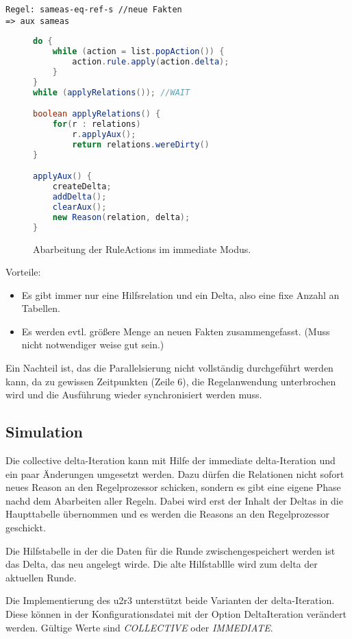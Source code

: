 \begin{verbatim}
Regel: sameas-eq-ref-s //neue Fakten
=> aux sameas
\end{verbatim}

\begin{figure}[htp]
	\caption{Abarbeitung der RuleActions im immediate Modus.}
	\label{code-immediate-delta-iteration}
	\begin{lstlisting}[language=Java]
do {
	while (action = list.popAction()) {
		action.rule.apply(action.delta);
	}
}
while (applyRelations()); //WAIT

boolean applyRelations() {
	for(r : relations)
		r.applyAux();
		return relations.wereDirty()
}

applyAux() {
	createDelta;
	addDelta();
	clearAux();
	new Reason(relation, delta);
}
	\end{lstlisting}
\end{figure}

Vorteile:
\begin{itemize}
  \item Es gibt immer nur eine Hilfsrelation und ein Delta, also eine fixe Anzahl an Tabellen.
  \item Es werden evtl. größere Menge an neuen Fakten zusammengefasst. (Muss nicht notwendiger weise gut sein.)
\end{itemize}

Ein Nachteil ist, das die Parallelsierung nicht vollständig durchgeführt werden kann, da zu gewissen Zeitpunkten (Zeile 6), die Regelanwendung unterbrochen wird und die Ausführung wieder synchronisiert werden muss.

\subsection{Simulation}

Die collective delta-Iteration kann mit Hilfe der immediate delta-Iteration und ein paar Änderungen umgesetzt werden. Dazu dürfen die Relationen nicht sofort neues Reason an den Regelprozessor schicken, sondern es gibt eine eigene Phase nachd dem Abarbeiten aller Regeln. Dabei wird erst der Inhalt der Deltas in die Haupttabelle übernommen und es werden die Reasons an den Regelprozessor geschickt.

Die Hilfstabelle in der die Daten für die Runde zwischengespeichert werden ist das Delta, das neu angelegt wirde. Die alte Hilfstabllle wird zum delta der aktuellen Runde.


Die Implementierung des u2r3 unterstützt beide Varianten der delta-Iteration. Diese können in der Konfigurationsdatei mit der Option DeltaIteration verändert werden. Gültige Werte sind \emph{COLLECTIVE} oder \emph{IMMEDIATE}.
